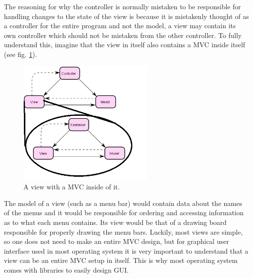 The reasoning for why the controller is normally mistaken to be responsible
for handling changes to the state of the view is because it is mistakenly
thought of as a controller for the entire program and not the model,
a view may contain its own controller which should not be mistaken
from the other controller. To fully understand this, imagine that
the view in itself also contains a MVC inside itself (see fig. \ref{fig:MVCeption}).

\begin{figure}[h]
\begin{centering}
\includegraphics[width=0.6\textwidth]{MVCeption}
\par\end{centering}

\caption{\label{fig:MVCeption}A view with a MVC inside of it.}
\end{figure}


The model of a view (such as a menu bar) would contain data about
the names of the menus and it would be responsible for ordering and
accessing information as to what each menu contains. Its view would
be that of a drawing board responsible for properly drawing the menu
bars. Luckily, most views are simple, so one does not need to make
an entire MVC design, but for graphical user interface used in most
operating system it is very important to understand that a view can
be an entire MVC setup in itself. This is why most operating system
comes with libraries to easily design GUI.

